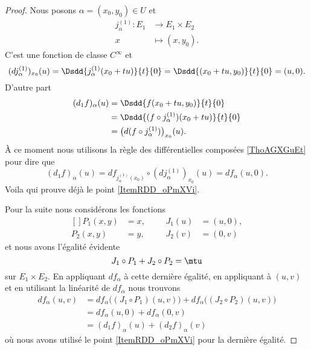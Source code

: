 \begin{proof}
    Nous posons \( \alpha=(x_0,y_0)\in U\) et
    \begin{equation}
        \begin{aligned}
            j_{\alpha}^{(1)}\colon E_1&\to E_1\times E_2 \\
            x&\mapsto (x,y_0). 
        \end{aligned}
    \end{equation}
    C'est une fonction de classe \(  C^{\infty}\) et 
    \begin{equation}
        (dj_{\alpha}^{(1)})_{x_0}(u)=\Dsdd{ j_{\alpha}^{(1)}(x_0+tu) }{t}{0}=\Dsdd{ (x_0+tu,y_0) }{t}{0}=(u,0).
    \end{equation}
    D'autre part 
    \begin{subequations}
        \begin{align}
            (d_1f)_{\alpha}(u)&=\Dsdd{ f(x_0+tu,y_0) }{t}{0}\\
            &=\Dsdd{ (f\circ j_{\alpha}^{(1)})(x_0+tu) }{t}{0}\\
            &=\big( d(f\circ j_{\alpha}^{(1)}) \big)_{x_0}(u).
        \end{align}
    \end{subequations}
    À ce moment nous utilisons la règle des différentielles composées \ref{ThoAGXGuEt} pour dire que
    \begin{equation}
        (d_1f)_{\alpha}(u)=df_{j_{\alpha}^{(1)}(x_0)}\circ (dj_{\alpha}^{(1)})_{x_0}(u)=df_{\alpha}(u,0).
    \end{equation}
    Voila qui prouve déjà le point \ref{ItemRDD_oPmXVi}.

    Pour la suite nous considérons les fonctions 
    \begin{equation}
        \begin{aligned}[]
            P_1(x,y)&=x,&&&J_1(u)&=(u,0),\\
            P_2(x,y)&=y,&&&J_2(v)&=(0,v)
        \end{aligned}
    \end{equation}
    et nous avons l'égalité évidente
    \begin{equation}
        J_1\circ P_1+J_2\circ P_2=\mtu
    \end{equation}
    sur \( E_1\times E_2\). En appliquant \( df_{\alpha}\) à cette dernière égalité, en appliquant à \( (u,v)\) et en utilisant la linéarité de \( df_{\alpha}\) nous trouvons
    \begin{subequations}
        \begin{align}
            df_{\alpha}(u,v)&=df_{\alpha}\big( (J_1\circ P_1)(u,v) \big)+df_{\alpha}\big( (J_2\circ P_2)(u,v) \big)\\
            &=df_{\alpha}(u,0)+df_{\alpha}(0,v)\\
            &=(d_1f)_{\alpha}(u)+(d_2f)_{\alpha}(v)
        \end{align}
    \end{subequations}
    où nous avons utilisé le point \ref{ItemRDD_oPmXVi} pour la dernière égalité.
\end{proof}

